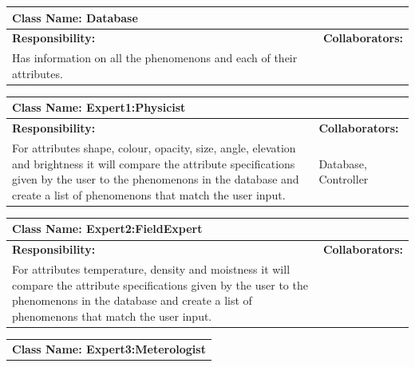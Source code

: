 \documentclass[]{article}
\begin{document}
\begin{enumerate}[a)]
	\begin{table}[ht]
		\centering
		\begin{tabular}{|p{5cm}|p{5cm}|}
		\hline 
		 \multicolumn{2}{|l|}{\textbf{Class Name: Database}} \\
		\hline
		\textbf{Responsibility:} & \textbf{Collaborators:} \\
		\hline
		Has information on all the phenomenons and each of their attributes. \vspace{1in} & \\
		\hline
		\end{tabular}
	\end{table}
	\begin{table}[ht]
		\centering
		\begin{tabular}{|p{5cm}|p{5cm}|}
		\hline 
		 \multicolumn{2}{|l|}{\textbf{Class Name: Expert1:Physicist}} \\
		\hline
		\textbf{Responsibility:} & \textbf{Collaborators:} \\
		\hline
		For attributes shape, colour, opacity, size, angle, elevation and brightness it will compare the attribute specifications given by the user to the phenomenons in the database and create a list of phenomenons that match the user input.  \vspace{1in} & Database, Controller \\
		\hline
		\end{tabular}
	\end{table}
	\begin{table}[ht]
		\centering
		\begin{tabular}{|p{5cm}|p{5cm}|}
		\hline 
		 \multicolumn{2}{|l|}{\textbf{Class Name: Expert2:FieldExpert}} \\
		\hline
		\textbf{Responsibility:} & \textbf{Collaborators:} \\
		\hline
		For attributes temperature, density and moistness it will compare the attribute specifications given by the user to the phenomenons in the database and create a list of phenomenons that match the user input. \vspace{1in} & \\
		\hline
		\end{tabular}
	\end{table}
	\begin{table}[ht]
		\centering
		\begin{tabular}{|p{5cm}|p{5cm}|}
		\hline 
		 \multicolumn{2}{|l|}{\textbf{Class Name: Expert3:Meterologist}} \\

\end{tabular}
\end{table}
\end{enumerate}
\end{document}
